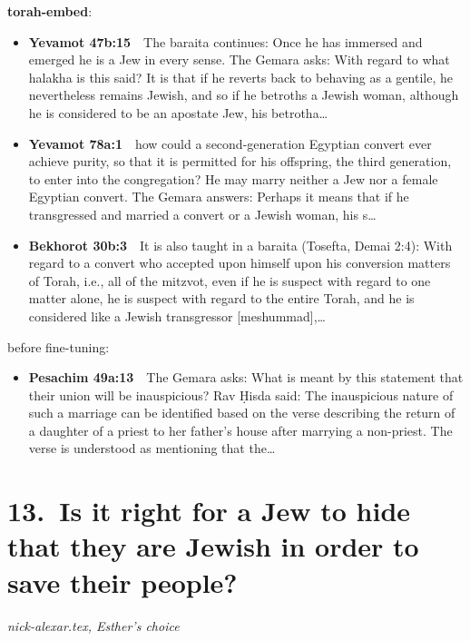 \documentclass[11pt,a4paper]{article}
\begin{document}
{\color{quiet}\small\textbf{torah-embed}:}
\begin{itemize}[leftmargin=1.2em,itemsep=3pt]
\item {\color{ref}\textbf{Yevamot 47b:15}}\ \ The baraita continues: Once he has immersed and emerged he is a Jew in every sense. The Gemara asks: With regard to what halakha is this said? It is that if he reverts back to behaving as a gentile, he nevertheless remains Jewish, and so if he betroths a Jewish woman, although he is considered to be an apostate Jew, his betrotha\ldots
\item {\color{ref}\textbf{Yevamot 78a:1}}\ \ how could a second-generation Egyptian convert ever achieve purity, so that it is permitted for his offspring, the third generation, to enter into the congregation? He may marry neither a Jew nor a female Egyptian convert. The Gemara answers: Perhaps it means that if he transgressed and married a convert or a Jewish woman, his s\ldots
\item {\color{ref}\textbf{Bekhorot 30b:3}}\ \ It is also taught in a baraita (Tosefta, Demai 2:4): With regard to a convert who accepted upon himself upon his conversion matters of Torah, i.e., all of the mitzvot, even if he is suspect with regard to one matter alone, he is suspect with regard to the entire Torah, and he is considered like a Jewish transgressor [meshummad],\ldots
\end{itemize}
{\color{quiet}\small before fine-tuning:}
\begin{itemize}[leftmargin=1.2em]
\item {\color{ref}\textbf{Pesachim 49a:13}}\ \ The Gemara asks: What is meant by this statement that their union will be inauspicious? Rav Ḥisda said: The inauspicious nature of such a marriage can be identified based on the verse describing the return of a daughter of a priest to her father’s house after marrying a non-priest. The verse is understood as mentioning that the\ldots
\end{itemize}

\section*{13.\ Is it right for a Jew to hide that they are Jewish in order to save their people?}
{\color{quiet}\small\textit{nick-alexar.tex, Esther's choice}}
\end{document}
